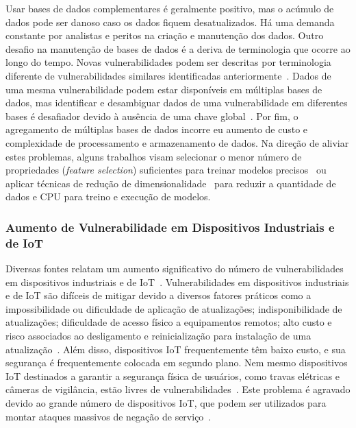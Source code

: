 Usar bases de dados complementares é geralmente positivo, mas o acúmulo de dados pode ser danoso caso os dados fiquem desatualizados. Há uma demanda constante por analistas e peritos na criação e manutenção dos dados. Outro desafio na manutenção de bases de dados é a deriva de terminologia que ocorre ao longo do tempo. Novas vulnerabilidades podem ser descritas por terminologia diferente de vulnerabilidades similares identificadas anteriormente~\cite{le2019automated}. Dados de uma mesma vulnerabilidade podem estar disponíveis em múltiplas bases de dados, mas identificar e desambiguar dados de uma vulnerabilidade em diferentes bases é desafiador devido à ausência de uma chave global~\cite{dong2019towards}. Por fim, o agregamento de múltiplas bases de dados incorre eu aumento de custo e complexidade de processamento e armazenamento de dados. Na direção de aliviar estes problemas, alguns trabalhos visam selecionar o menor número de propriedades (\emph{feature selection}) suficientes para treinar modelos precisos~\cite{kudjo2020bellwether} ou aplicar técnicas de redução de dimensionalidade~\cite{malhotra21prediction} para reduzir a quantidade de dados e CPU para treino e execução de modelos.

\subsubsection{Aumento de Vulnerabilidade em Dispositivos Industriais e de IoT}

Diversas fontes relatam um aumento significativo do número de vulnerabilidades em dispositivos industriais e de IoT~\cite{sonicwall2024threatreport, zscaler23report, panesar23iot}. Vulnerabilidades em dispositivos industriais e de IoT são difíceis de mitigar devido a diversos fatores práticos como a impossibilidade ou dificuldade de aplicação de atualizações; indisponibilidade de atualizações; dificuldade de acesso físico a equipamentos remotos; alto custo e risco associados ao desligamento e reinicialização para instalação de uma atualização~\cite{wang2019staged, thomas2020catch, alanazi2023scada}. Além disso, dispositivos IoT frequentemente têm baixo custo, e sua segurança é frequentemente colocada em segundo plano. Nem mesmo dispositivos IoT destinados a garantir a segurança física de usuários, como travas elétricas e câmeras de vigilância, estão livres de vulnerabilidades~\cite{costin2016security, caballero2023research, panesar23iot}. Este problema é agravado devido ao grande número de dispositivos IoT, que podem ser utilizados para montar ataques massivos de negação de serviço~\cite{injadat20iot, dedonno2017analysis, jia2020flowguard}.

